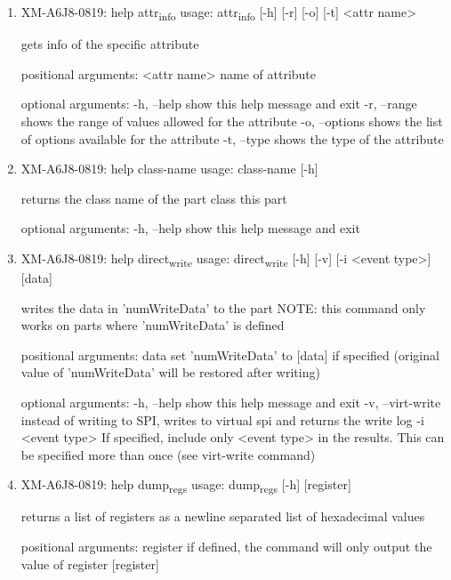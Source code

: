 \documentclass[11pt]{article}
\begin{document}
\begin{enumerate}
\item XM-A6J8-0819: help attr\textsubscript{info}
\label{sec:org30f97f6}
usage: attr\textsubscript{info} [-h] [-r] [-o] [-t] <attr name>

gets info of the specific attribute

positional arguments:
  <attr name>    name of attribute

optional arguments:
  -h, --help     show this help message and exit
  -r, --range    shows the range of values allowed for the attribute
  -o, --options  shows the list of options available for the attribute
  -t, --type     shows the type of the attribute

\item XM-A6J8-0819: help class-name
\label{sec:org353922d}
usage: class-name [-h]

returns the class name of the part class this part

optional arguments:
  -h, --help  show this help message and exit

\item XM-A6J8-0819: help direct\textsubscript{write}
\label{sec:org9dea2dc}
usage: direct\textsubscript{write} [-h] [-v] [-i <event type>] [data]

writes the data in 'numWriteData' to the part NOTE: this command only works on
parts where 'numWriteData' is defined

positional arguments:
  data              set 'numWriteData' to [data] if specified (original value
                    of 'numWriteData' will be restored after writing)

optional arguments:
  -h, --help        show this help message and exit
  -v, --virt-write  instead of writing to SPI, writes to virtual spi and
                    returns the write log
  -i <event type>   If specified, include only <event type> in the results.
                    This can be specified more than once (see virt-write
                    command)

\item XM-A6J8-0819: help dump\textsubscript{regs}
\label{sec:org45ebef6}
usage: dump\textsubscript{regs} [-h] [register]

returns a list of registers as a newline separated list of hexadecimal values

positional arguments:
  register    if defined, the command will only output the value of register
              [register]


\end{enumerate}
\end{document}
